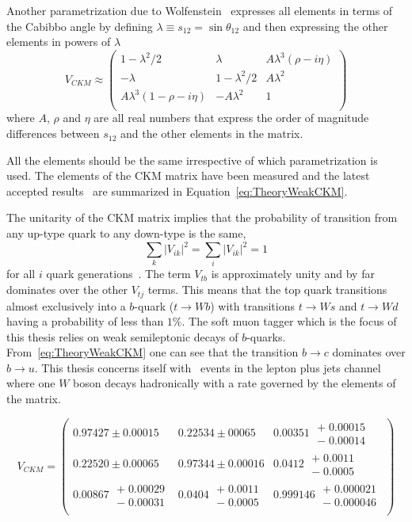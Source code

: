Another parametrization due to Wolfenstein~\cite{Theory:CKMWolfenstein} expresses all elements in terms of the Cabibbo angle by defining $\lambda\equiv s_{12}=\sin \theta_{12}$ and then expressing the other elements in powers of $\lambda$
%
\begin{equation}
  V_{CKM}
  \approx
  \begin{pmatrix}
  1-\lambda^2/2 & \lambda & A\lambda^3(\rho-i\eta) \\
  -\lambda & 1-\lambda^2/2 & A\lambda^2 \\ 
  A\lambda^3(1-\rho-i\eta) & -A\lambda^2 & 1\\
  \end{pmatrix}
\end{equation}
%
where $A$, $\rho$ and $\eta$ are all real numbers that express the order of magnitude differences between $s_{12}$ and the other elements in the matrix.

All the elements should be the same irrespective of which parametrization is used. The elements of the CKM matrix have been measured and the latest accepted results~\cite{Theory:PDGBooklet} are summarized in Equation~\ref{eq:TheoryWeakCKM}. 

The unitarity of the CKM matrix implies that the probability of transition from any up-type quark to any down-type is the same,
%
\begin{equation} 
  \label{eq:TheoryWeakMixingTotal}
  \sum_{k}|V_{ik}|^{2}=\sum_{i}|V_{ik}|^{2}=1
\end{equation}
%
for all $i$ quark generations~\cite{Theory:WeakUniversaility}.
The term $V_{tb}$ is approximately unity and by far dominates over the other $V_{tj}$ terms. This means that the top quark transitions almost exclusively into a $b$-quark ($t\rightarrow Wb$) with transitions $t\rightarrow Ws$ and $t\rightarrow Wd$ having a probability of less than $1\%$. The soft muon tagger which is the focus of this thesis relies on weak semileptonic decays of $b$-quarks. From~\ref{eq:TheoryWeakCKM} one can see that the transition $b\rightarrow c$ dominates over $b\rightarrow u$. This thesis concerns itself with \ttbar\ events in the lepton plus jets channel where one $W$ boson decays hadronically with a rate governed by the elements of the matrix.

\begin{equation}
  V_{CKM}
  =
  \begin{pmatrix}
    0.97427\pm0.00015 & 0.22534\pm00065 & 0.00351\;\substack{+\;0.00015\\-\;0.00014} \\
    0.22520\pm0.00065 & 0.97344\pm0.00016 & 0.0412\;\substack{+\;0.0011\\-\;0.0005} \\
    0.00867\;\substack{+\;0.00029\\-\;0.00031} & 0.0404\;\substack{+\;0.0011\\-\;0.0005} & 0.999146\;\substack{+\;0.000021\\-\;0.000046} \\
  \end{pmatrix}
  \label{eq:TheoryWeakCKM}
\end{equation}

